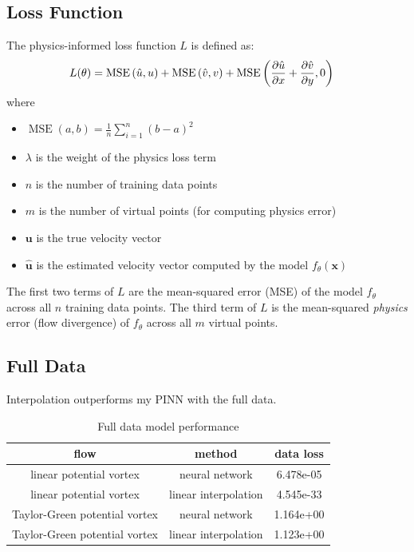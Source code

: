 \documentclass[11pt]{article}
\begin{document}
\subsection{Loss Function} %

The physics-informed loss function $L$ is defined as:
\begin{align*}
    L(\theta) &=
    \operatorname{MSE}\left(\hat{u}, u\right)
    + \operatorname{MSE}\left(\hat{v}, v\right)
    + \operatorname{MSE}\left(\frac{\partial \hat{u}}{\partial x} + \frac{\partial \hat{v}}{\partial y}, 0\right)
\end{align*}
where
\begin{itemize}
    \item $\operatorname{MSE}(a, b) = \frac{1}{n} \sum_{i=1}^n (b-a)^2$
    \item $\lambda$ is the weight of the physics loss term
    \item $n$ is the number of training data points
    \item $m$ is the number of virtual points (for computing physics error)
    \item $\boldsymbol{u}$ is the true velocity vector
    \item $\hat{\boldsymbol{u}}$ is the estimated velocity vector computed by the model $f_\theta(\boldsymbol{x})$
\end{itemize}
The first two terms of $L$ are the mean-squared error (MSE) of the model $f_\theta$ across all $n$ training data points. The third term of $L$ is the mean-squared \textit{physics} error (flow divergence) of $f_\theta$ across all $m$ virtual points.

\subsection{Full Data} %

Interpolation outperforms my PINN with the full data.
\begin{table}[H]
    \centering
    \caption{Full data model performance}
    \begin{tabular}{|c|c|c|}
        \hline
        flow & method & data loss \\
        \hline
        \hline
        linear potential vortex & neural network & 6.478e-05 \\
        linear potential vortex & linear interpolation & 4.545e-33 \\
        Taylor-Green potential vortex & neural network & 1.164e+00 \\
        Taylor-Green potential vortex & linear interpolation & 1.123e+00 \\
        \hline
    \end{tabular}
    \label{tab1b}
\end{table}
\end{document}
